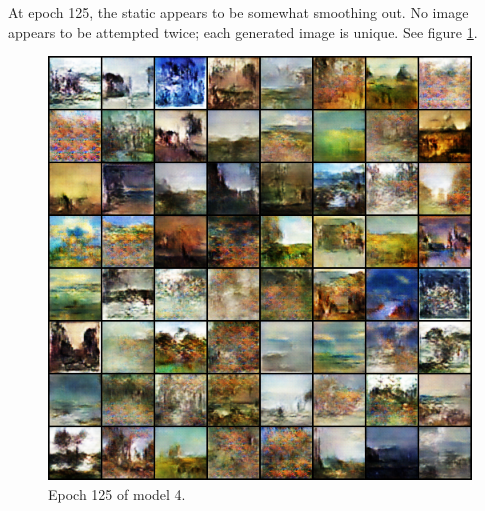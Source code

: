 \documentclass[11pt,letterpaper]{article}
\begin{document}
				At epoch 125, the static appears to be somewhat smoothing out.
				No image appears to be attempted twice; each generated image is unique.
				See figure \ref{fig:wa64:epoch125generator}.
				\begin{figure}
					\centering
					\includegraphics[width=1.0\linewidth]{results/model4/epoch125_generator}
					\caption{Epoch 125 of model 4.}
					\label{fig:wa64:epoch125generator}
				\end{figure}
\end{document}
